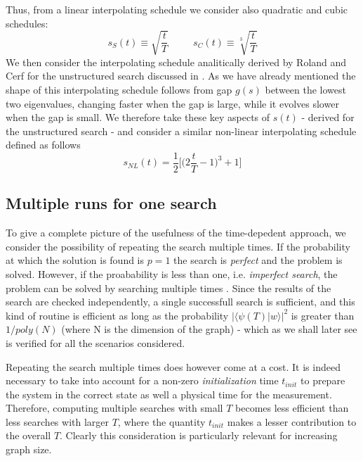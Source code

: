         Thus, from a linear interpolating schedule we consider also quadratic and cubic schedules:
        \begin{equation}
          s_S(t) \equiv \sqrt{\frac{t}{T}} \hspace{30pt} s_C(t) \equiv \sqrt[3]{\frac{t}{T}}
        \end{equation}
        We then consider the interpolating schedule analitically derived by Roland and Cerf for the unstructured search discussed in . As we have already mentioned the shape of this interpolating schedule follows from gap $g(s)$ between the lowest two eigenvalues, changing faster when the gap is large, while it evolves slower when the gap is small. We therefore take these key aspects of $s(t)$ - derived for the unstructured search - and consider a similar non-linear interpolating schedule defined as follows
        \begin{equation}
            s_{NL}(t) = \frac{1}{2}\Big[\Big(2\frac{t}{T}-1\Big)^{3}+1\Big]
        \end{equation}

        


        \subsection{Multiple runs for one search}\label{subsec:multiple_runs}
        To give a complete picture of the usefulness of the time-depedent approach, we consider the possibility of repeating the search multiple times. If the probability at which the solution is found is $p=1$ the search is \textit{perfect} and the problem is solved. However, if the proabability is less than one, i.e. \textit{imperfect search}, the problem can be solved by searching multiple times . Since the results of the search are checked independently, a single successfull search is sufficient, and this kind of routine is efficient as long as the probability $\big|\langle\psi(T)| w\rangle\big|^2$ is greater than $1/poly(N)$ (where N is the dimension of the graph) \cite{Morley2018} - which as we shall later see is verified for all the scenarios considered.

        Repeating the search multiple times does however come at a cost. It is indeed necessary to take into account for a non-zero \textit{initialization} time $t_{init}$ to prepare the system in the correct state as well a physical time for the measurement. Therefore, computing multiple searches with small $T$ becomes less efficient than less searches with larger $T$, where the quantity $t_{init}$ makes a lesser contribution to the overall $T$. Clearly this consideration is particularly relevant for increasing graph size.

